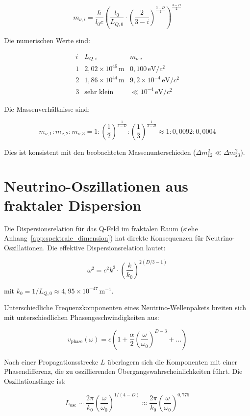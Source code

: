 \[
m_{\nu,i} = \frac{\hbar}{l_0 c} \left( \frac{l_0}{L_{Q,0}} \cdot \left(\frac{2}{3-i}\right)^{\frac{3-D}{2}} \right)^{\frac{3-D}{2}}
\]

Die numerischen Werte sind:

\[
\begin{array}{c|c|c}
i & L_{Q,i} & m_{\nu,i} \\
\hline
1 & 2{,}02 \times 10^{46} \, \text{m} & 0{,}100 \, \text{eV}/c^2 \\
2 & 1{,}86 \times 10^{44} \, \text{m} & 9{,}2 \times 10^{-4} \, \text{eV}/c^2 \\
3 & \text{sehr klein} & \ll 10^{-4} \, \text{eV}/c^2
\end{array}
\]

Die Massenverhältnisse sind:

\[
m_{\nu,1} : m_{\nu,2} : m_{\nu,3} = 1 : \left(\frac{1}{2}\right)^{\frac{1}{3-D}} : \left(\frac{1}{3}\right)^{\frac{1}{3-D}} \approx 1 : 0{,}0092 : 0{,}0004
\]

Dies ist konsistent mit den beobachteten Massenunterschieden (\( \Delta m_{12}^2 \ll \Delta m_{23}^2 \)).

\section{Neutrino-Oszillationen aus fraktaler Dispersion}
\label{sec:nu_oszillationen}

Die Dispersionsrelation für das Q-Feld im fraktalen Raum (siehe Anhang~\ref{app:spektrale_dimension}) hat direkte Konsequenzen für Neutrino-Oszillationen. Die effektive Dispersionsrelation lautet:

\[
\omega^2 = c^2 k^2 \cdot \left( \frac{k}{k_0} \right)^{2(D/3-1)}
\]

mit \( k_0 = 1/L_{Q,0} \approx 4{,}95 \times 10^{-47} \, \text{m}^{-1} \).

Unterschiedliche Frequenzkomponenten eines Neutrino-Wellenpakets breiten sich mit unterschiedlichen Phasengeschwindigkeiten aus:

\[
v_{\text{phase}}(\omega) = c \left( 1 + \frac{\alpha}{2} \left( \frac{\omega}{\omega_0} \right)^{D-3} + \dots \right)
\]

Nach einer Propagationsstrecke \( L \) überlagern sich die Komponenten mit einer Phasendifferenz, die zu oszillierenden Übergangswahrscheinlichkeiten führt. Die Oszillationslänge ist:

\[
L_{\text{osc}} \sim \frac{2\pi}{k_0} \left( \frac{\omega}{\omega_0} \right)^{1/(4-D)} \approx \frac{2\pi}{k_0} \left( \frac{\omega}{\omega_0} \right)^{0{,}775}
\]


